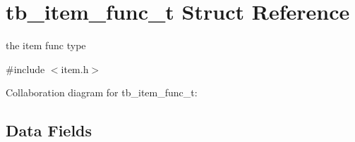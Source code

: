 \hypertarget{structtb__item__func__t}{\section{tb\-\_\-item\-\_\-func\-\_\-t Struct Reference}
\label{structtb__item__func__t}
}


the item func type  




{\ttfamily \#include $<$item.\-h$>$}



Collaboration diagram for tb\-\_\-item\-\_\-func\-\_\-t\-:
\subsection*{Data Fields}
